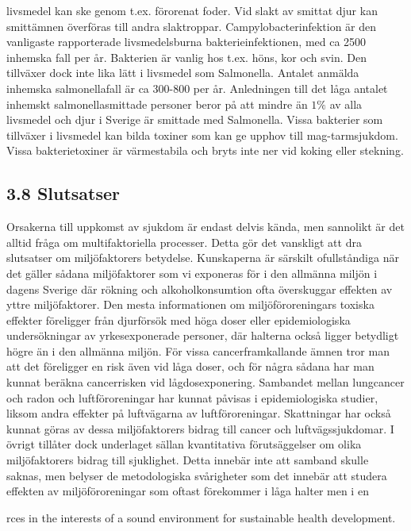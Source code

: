 livsmedel kan ske genom t.ex. förorenat foder. Vid slakt av smittat djur kan smittämnen överföras till andra slaktroppar. Campylobacterinfektion är den vanligaste rapporterade livsmedelsburna bakterieinfektionen, med ca 2500 inhemska fall per år. Bakterien är vanlig hos t.ex. höns, kor och svin. Den tillväxer dock inte lika lätt i livsmedel som Salmonella.
Antalet anmälda inhemska salmonellafall är ca 300-800 per år. Anledningen till det låga antalet inhemskt salmonellasmittade personer beror på att mindre än \(1 \%\) av alla livsmedel och djur i Sverige är smittade med Salmonella.
Vissa bakterier som tillväxer i livsmedel kan bilda toxiner som kan ge upphov till mag-tarmsjukdom. Vissa bakterietoxiner är värmestabila och bryts inte ner vid koking eller stekning.
\subsection*{3.8 Slutsatser}
Orsakerna till uppkomst av sjukdom är endast delvis kända, men sannolikt är det alltid fråga om multifaktoriella processer. Detta gör det vanskligt att dra slutsatser om miljöfaktorers betydelse. Kunskaperna är särskilt ofullståndiga när det gäller sådana miljöfaktorer som vi exponeras för i den allmänna miljön i dagens Sverige där rökning och alkoholkonsumtion ofta överskuggar effekten av yttre miljöfaktorer. Den mesta informationen om miljöföroreningars toxiska effekter föreligger från djurförsök med höga doser eller epidemiologiska undersökningar av yrkesexponerade personer, där halterna också ligger betydligt högre än i den allmänna miljön. För vissa cancerframkallande ämnen tror man att det föreligger en risk även vid låga doser, och för några sådana har man kunnat beräkna cancerrisken vid lågdosexponering. Sambandet mellan lungcancer och radon och luftföroreningar har kunnat påvisas i epidemiologiska studier, liksom andra effekter på luftvägarna av luftföroreningar. Skattningar har också kunnat göras av dessa miljöfaktorers bidrag till cancer och luftvägssjukdomar. I övrigt tillåter dock underlaget sällan kvantitativa förutsäggelser om olika miljöfaktorers bidrag till sjuklighet. Detta innebär inte att samband skulle saknas, men belyser de metodologiska svårigheter som det innebär att studera effekten av miljöföroreningar som oftast förekommer i låga halter men i en

rces in the interests of a sound environment for sustainable health development.

